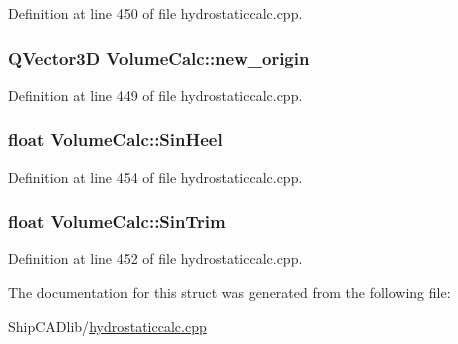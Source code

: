 Definition at line 450 of file hydrostaticcalc.\-cpp.

\hypertarget{structVolumeCalc_aed779c2eace630d0d41239df4d371407}{
\subsubsection[{new\-\_\-origin}]{\setlength{\rightskip}{0pt plus 5cm}Q\-Vector3\-D Volume\-Calc\-::new\-\_\-origin}}\label{structVolumeCalc_aed779c2eace630d0d41239df4d371407}


Definition at line 449 of file hydrostaticcalc.\-cpp.

\hypertarget{structVolumeCalc_ac1612ccb79673d6800b89a1acf46a028}{
\subsubsection[{Sin\-Heel}]{\setlength{\rightskip}{0pt plus 5cm}float Volume\-Calc\-::\-Sin\-Heel}}\label{structVolumeCalc_ac1612ccb79673d6800b89a1acf46a028}


Definition at line 454 of file hydrostaticcalc.\-cpp.

\hypertarget{structVolumeCalc_a36511f2f033b5488a4f677586f3e8f97}{
\subsubsection[{Sin\-Trim}]{\setlength{\rightskip}{0pt plus 5cm}float Volume\-Calc\-::\-Sin\-Trim}}\label{structVolumeCalc_a36511f2f033b5488a4f677586f3e8f97}


Definition at line 452 of file hydrostaticcalc.\-cpp.



The documentation for this struct was generated from the following file\-:\begin{DoxyCompactItemize}
\item 
Ship\-C\-A\-Dlib/\hyperlink{hydrostaticcalc_8cpp}{hydrostaticcalc.\-cpp}\end{DoxyCompactItemize}
